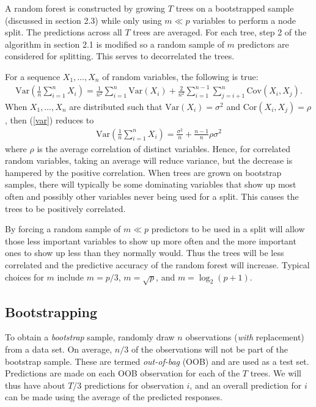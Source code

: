 A random forest is constructed by growing $T$ trees on a bootstrapped sample (discussed in section 2.3) while only using $m\ll p$ variables to perform a node split. The predictions across all $T$ trees are averaged. For each tree, step 2 of the algorithm in section 2.1 is modified so a random sample of $m$ predictors are considered for splitting. This serves to decorrelated the trees.

For a sequence $X_1,\ldots,X_n$ of random variables, the following is true:
\begin{eqnarray}
\mathrm{Var}\left(\frac{1}{n}\sum_{i=1}^nX_i\right) = \frac{1}{n^2}\sum_{i=1}^n\mathrm{Var}(X_i) + \frac{2}{n^2}\sum_{i=1}^{n-1}\sum_{j=i+1}^n\mathrm{Cov}(X_i,X_j).
\label{var}
\end{eqnarray}
When $X_1,\ldots,X_n$ are distributed such that $\mathrm{Var}(X_i)=\sigma^2$ and $\mathrm{Cor}(X_i, X_j)=\rho$, then (\ref{var}) reduces to
\begin{eqnarray}
\mathrm{Var}\left(\frac{1}{n}\sum_{i=1}^nX_i\right) = \frac{\sigma^2}{n} + \frac{n-1}{n}\rho\sigma^2
\end{eqnarray}
where $\rho$ is the average correlation of distinct variables. Hence, for correlated random variables, taking an average will reduce variance, but the decrease is hampered by the positive correlation. When trees are grown on bootstrap samples, there will typically be some dominating variables that show up most often and possibly other variables never being used for a split. This causes the trees to be positively correlated.

By forcing a random sample of $m\ll p$ predictors to be used in a split will allow those less important variables to show up more often and the more important ones to show up less than they normally would. Thus the trees will be less correlated and the predictive accuracy of the random forest will increase. Typical choices for $m$ include $m=p/3$, $m=\sqrt{p}$, and $m=\log_2(p + 1)$.

\subsection{Bootstrapping}

To obtain a \emph{bootstrap} sample, randomly draw $n$ observations (\emph{with} replacement) from a data set. On average, $n/3$ of the observations will not be part of the bootstrap sample. These are termed \emph{out-of-bag} (OOB) and are used as a test set. Predictions are made on each OOB observation for each of the $T$ trees. We will thus have about $T/3$ predictions for observation $i$, and an overall prediction for $i$ can be made using the average of the predicted responses.

